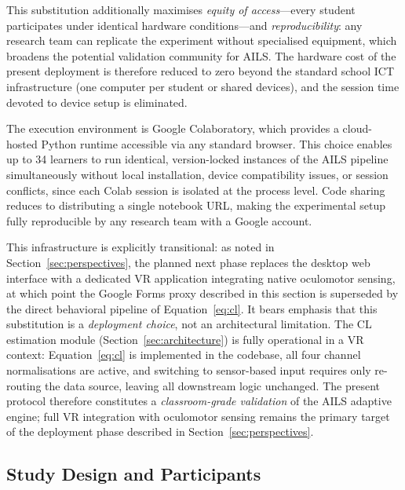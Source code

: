 \documentclass[ASNA,twocolumn]{USG} %
\begin{document}
This substitution additionally maximises \emph{equity of access}---every
student participates under identical hardware conditions---and
\emph{reproducibility}: any research team can replicate the
experiment without specialised equipment, which broadens the
potential validation community for AILS.
The hardware cost of the present deployment is therefore reduced to
zero beyond the standard school ICT infrastructure (one computer
per student or shared devices), and the session time devoted to
device setup is eliminated.

The execution environment is Google Colaboratory, which provides a
cloud-hosted Python runtime accessible via any standard browser.
This choice enables up to 34 learners to run identical, version-locked
instances of the AILS pipeline simultaneously without local installation,
device compatibility issues, or session conflicts, since each Colab
session is isolated at the process level.
Code sharing reduces to distributing a single notebook URL, making
the experimental setup fully reproducible by any research team with
a Google account.

This infrastructure is explicitly transitional: as noted in
Section~\ref{sec:perspectives}, the planned next phase replaces
the desktop web interface with a dedicated VR application integrating
native oculomotor sensing, at which point the Google Forms proxy
described in this section is superseded by the direct behavioral
pipeline of Equation~\eqref{eq:cl}.
It bears emphasis that this substitution is a \emph{deployment
choice}, not an architectural limitation. The CL estimation module
(Section~\ref{sec:architecture}) is fully operational in a VR
context: Equation~\eqref{eq:cl} is implemented in the codebase,
all four channel normalisations are active, and switching to
sensor-based input requires only re-routing the data source,
leaving all downstream logic unchanged.
The present protocol therefore constitutes a \emph{classroom-grade
validation} of the AILS adaptive engine; full VR integration with
oculomotor sensing remains the primary target of the deployment
phase described in Section~\ref{sec:perspectives}.

\subsection{Study Design and Participants}
\label{sec:study_design}
\end{document}
